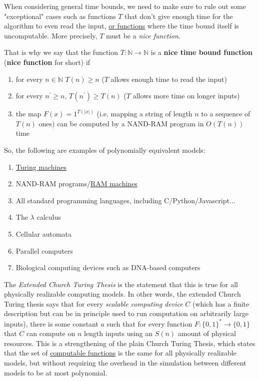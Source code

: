   When considering general time bounds, we need to make sure to rule out some "exceptional" cases such as functions $T$ that don't give enough time for the algorithm to even read the input, \hyperref[def:or-function]{or functions} where the time bound itself is uncomputable. More precisely, $T$ must be a \textit{nice function}. 

  \begin{definition}
    \label{def:nice-time-bound-function}
  That is why we say that the function $T: \mathbb{N} \to \mathbb{N}$ is a \textbf{nice time bound function} (\textbf{nice function} for short) if 
  \begin{enumerate}
      \item for every $n \in \mathbb{N}$ $T(n) \geq n$ ($T$ allows enough time to read the input)
      \item for every $n^\prime \geq n$, $T(n^\prime) \geq T(n)$ ($T$ allows more time on longer inputs)
      \item the map $F(x) = 1^{T(|x|)}$ (i.e. mapping a string of length $n$ to a sequence of $T(n)$ ones) can be computed by a NAND-RAM program in $O(T(n))$ time
  \end{enumerate}
  \end{definition}

  So, the following are examples of polynomially equivalent models: 
  \begin{enumerate}
      \item \hyperref[def:turing-machine]{Turing machines}
      \item NAND-RAM programs/\hyperref[def:ram-machine]{RAM machines}
      \item All standard programming languages, including C/Python/Javascript...
      \item The $\lambda$ calculus
      \item Cellular automata
      \item Parallel computers
      \item Biological computing devices such as DNA-based computers 
  \end{enumerate}

  The \textit{Extended Church Turing Thesis} is the statement that this is true for all physically realizable computing models. In other words, the extended Church Turing thesis says that for every \textit{scalable computing device} $C$ (which has a finite description but can be in principle used to run computation on arbitrarily large inputs), there is some constant $a$ such that for every function $F: \{0,1\}^* \to \{0,1\}$ that $C$ can compute on $n$ length inputs using an $S(n)$ amount of physical resources. This is a strengthening of the plain Church Turing Thesis, which states that the set of \hyperref[def:computable-functions]{computable functions} is the same for all physically realizable models, but without requiring the overhead in the simulation between different models to be at most polynomial. 

